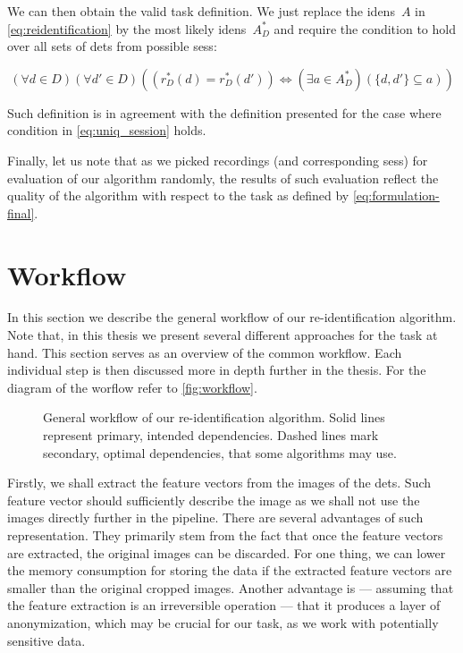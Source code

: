 We can then obtain the valid task definition. We just replace the
\glspl{iden}~$A$ in \autoref{eq:reidentification} by the most likely
\glspl{iden}~$A_D^*$ and require the condition to hold over all sets of
\glspl{det} from possible \glspl{ses}:

\begin{equation}
(\forall d \in D) (\forall d' \in D) ((r_D^*(d) = r_D^*(d')) \Leftrightarrow (\exists a \in A_D^*) (\{d, d'\} \subseteq a))
\label{eq:formulation-final}
\end{equation}

Such definition is in agreement with the definition presented for the case
where condition in \autoref{eq:uniq_session} holds.

Finally, let us note that as we picked recordings (and corresponding
\glspl{ses}) for evaluation of our algorithm randomly, the results of such
evaluation reflect the quality of the algorithm with respect to the task as
defined by \autoref{eq:formulation-final}.


\section{Workflow}

\label{sec:workflow}


In this section we describe the general workflow of our re-identification
algorithm. Note that, in this thesis we present several different
approaches for the task at hand. This section serves as an overview of the
common workflow. Each individual step is then discussed more in depth further
in the thesis. For the diagram of the worflow refer to \autoref{fig:workflow}.

\begin{figure}
    \centering
    \def\svgwidth{\textwidth}
    
    \caption[General workflow of our re-identification algorithm]{General workflow of our re-identification algorithm. Solid lines represent primary, intended dependencies.
    Dashed lines mark secondary, optimal dependencies, that some algorithms may use.}
    \label{fig:workflow}
\end{figure}

Firstly, we shall extract the feature vectors from the images of the
\glspl{det}. Such feature vector should sufficiently describe the image
as we shall not use the images directly further in the pipeline. There
are several advantages of such representation. They primarily stem from the fact
that once the feature vectors are extracted, the original images can be
discarded. For one thing, we can lower the memory consumption for storing
the data if the extracted feature vectors are smaller than the original
cropped images. Another advantage is --- assuming that the feature extraction
is an irreversible operation --- that it produces a layer of anonymization,
which may be crucial for our task, as we work with potentially sensitive
data.

